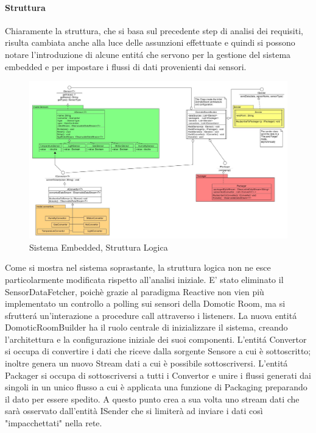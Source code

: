 \afterpage{\clearpage}

\newpage


\paragraph{Struttura} Chiaramente la struttura, che si basa sul precedente step di analisi dei requisiti, risulta cambiata anche alla luce delle assunzioni effettuate e quindi si possono notare l'introduzione di alcune entit\'a che servono per la gestione del sistema embedded e per impostare i flussi di dati provenienti dai sensori.

\begin{figure}[h]
\centering
\includegraphics[width=\textwidth]{Figures/LogicArchitecture/EmbeddedSystem/Structure}
\caption{Sistema Embedded, Struttura Logica}
\end{figure}

Come si mostra nel sistema soprastante, la struttura logica non ne esce particolarmente modificata rispetto all'analisi iniziale.
E' stato eliminato il SensorDataFetcher, poich\`e grazie al paradigma Reactive non vien più implementato un controllo a polling sui sensori della Domotic Room, ma si sfrutter\'a un'interazione a procedure call attraverso i listeners.
La nuova entit\'a DomoticRoomBuilder ha il ruolo centrale di inizializzare il sistema, creando l'architettura e la configurazione iniziale dei suoi componenti.
L'entit\'a Convertor si occupa di convertire i dati che riceve dalla sorgente Sensore a cui è sottoscritto; inoltre genera un nuovo Stream dati a cui è possibile sottoscriversi.
L'entit\'a Packager si occupa di sottoscriversi a tutti i Convertor e unire i flussi generati dai singoli in un unico flusso a cui è applicata una funzione di Packaging preparando il dato per essere spedito. A questo punto crea a sua volta uno stream dati che sarà osservato dall'entità ISender che si limiterà ad inviare i dati così "impacchettati" nella rete.

